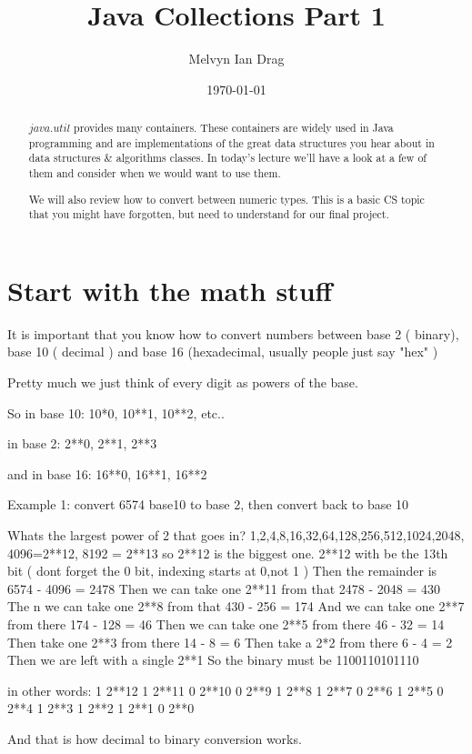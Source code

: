 \documentclass[12pt]{article}
\title{Java Collections Part 1}
\author{
	Melvyn Ian Drag
}
\date{\today}
\begin{document}
\maketitle

\begin{abstract}
$java.util$ provides many containers. These containers are widely used in Java programming and are implementations of the great data structures you hear about in data structures \& algorithms classes. In today's lecture we'll have a look at a few of them and consider when we would want to use them.

We will also review how to convert between numeric types. This is a basic CS
topic that you might have forgotten, but need to understand for our final
project.
\end{abstract}

\section{Start with the math stuff}
It is important that you know how to convert numbers between base 2 ( binary),
base 10 ( decimal ) and base 16 (hexadecimal, usually people just say "hex" )

Pretty much we just think of every digit as powers of the base.

So in base 10:
10*0, 10**1,  10**2, etc..

in base 2:
2**0, 2**1, 2**3

and in base 16:
16**0, 16**1, 16**2


Example 1:
convert 6574 base10  to base 2, then convert back to base 10

Whats the largest power of 2 that goes in?
1,2,4,8,16,32,64,128,256,512,1024,2048, 4096=2**12, 8192 = 2**13 so 2**12 is the
biggest one. 2**12 with be the 13th bit ( dont forget the 0 bit, indexing starts
at 0,not 1 )
Then the remainder is 6574 - 4096 = 2478
Then we can take one 2**11 from that 2478 - 2048 = 430
The n we can take one 2**8 from that 430 - 256 = 174
And we can take one 2**7 from there 174 - 128 = 46
Then we can take one 2**5 from there 46 - 32 = 14
Then take one 2**3 from there 14 - 8 = 6
Then take a 2*2 from there 6 - 4 = 2
Then we are left with a single 2**1
So the binary must be 
1100110101110

in other words:
1 2**12
1 2**11
0 2**10
0 2**9
1 2**8
1 2**7
0 2**6
1 2**5
0 2**4
1 2**3
1 2**2
1 2**1
0 2**0

And that is how decimal to binary conversion works.
\end{document}
